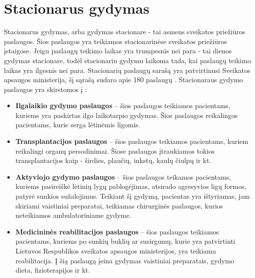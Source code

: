 \section{Stacionarus gydymas}

Stacionarus gydymas, arba gydymas stacionare - tai asmens sveikatos priežiūros paslaugos. Šios paslaugos yra teikiamos stacionarinėse sveikatos priežiūros įstaigose. Jeigu paslaugų teikimo laikas yra trumpesnis nei para - tai dienos gydymas stacionare, todėl stacionariu gydymu laikoma tada, kai paslaugų teikimo laikas yra ilgesnis nei para. Stacionarių paslaugų sarašą yra patvirtinusi Sveikatos apsaugos ministerija, šį sąrašą sudaro apie 180 paslaugų \cite{StacionaroPaslaugos}. Stacionaraus gydymo paslaugos yra skirstomos į \cite{LigoniuKasa}: 
\begin{itemize}
    \item \textbf{Ilgalaikio gydymo paslaugos} – šios paslaugos teikiamos pacientams, kuriems yra paskirtas ilgo laikotarpio gydymas. Šios paslaugos reikalingos pacientams, kurie serga lėtinėmis ligomis.
    \item \textbf{Transplantacijos paslaugos} – šios paslaugos teikiamos pacientams, kuriem reikalingi organų persodinimai. Šiose paslaugos įtraukiamos tokios transplantacijos kaip - širdies, plaučių, inkstų, kaulų čiulpų ir kt. 
    \item \textbf{Aktyviojo gydymo paslaugos} – šios paslaugos teikamos pacientams, kuriems pasireiškė lėtinių lygų pablogėjimas, atsirado agresyvios ligų formos, patyrė sunkios sužalojimus. Teikiant šį gydymą, pacientas yra ištyriamas, jam skiriami vaistiniai preparatai, teikiamas chirurginės paslaugos, kurios neteikiamos ambulatoriniame gydyme.
    \item \textbf{Medicininės reabilitacijos paslaugos} – šios paslaugos teikiamos pacientams, kuriems po sunkių buklių ar susirgumų, kurie yra patvirtinti Lietuvos Respublikos sveikatos apsaugos ministerijos, yra teikiama reabilitacija. Į šią paslaugą įeina gydymas vaistiniai preparatais, gydymo dieta, fizioterapijos ir kt.
\end{itemize}





